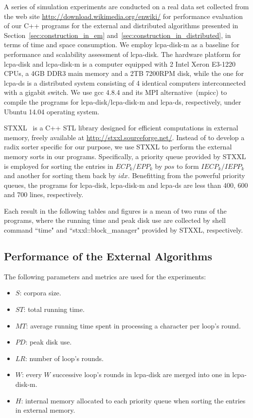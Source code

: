\documentclass[10pt,journal,letterpaper,compsoc]{IEEEtran}
\begin{document}
\begin{CJK*}{GBK}{song}
A series of simulation experiments are conducted on a real data set collected from the web site \url{http://download.wikimedia.org/enwiki/} for performance evaluation of our {C++} programs for the external and distributed algorithms presented in Section~\ref{sec:construction_in_em} and~\ref{sec:construction_in_distributed}, in terms of time and space consumption. We employ lcpa-disk-m as a baseline for performance and scalability assessment of lcpa-disk. The hardware platform for lcpa-disk and lcpa-disk-m is a computer equipped with 2 Intel Xeron E3-1220 CPUs, a 4GB DDR3 main memory and a 2TB 7200RPM disk, while the one for lcpa-ds is a distributed system consisting of 4 identical computers interconnected with a gigabit switch. We use gcc 4.8.4 and its MPI alternative~(mpicc) to compile the programs for lcpa-disk/lcpa-disk-m and lcpa-ds, respectively, under Ubuntu 14.04 operating system.

STXXL~\cite{Dementiev2007} is a {C++} STL library designed for efficient computations in external memory, freely available at \url{http://stxxl.sourceforge.net/}. Instead of to develop a radix sorter specific for our purpose, we use STXXL to perform the external memory sorts in our programs. Specifically, a priority queue  provided by STXXL is employed for sorting the entries in $ECP_k/EPP_k$ by $pos$ to form $IECP_k/IEPP_k$ and another for sorting them back by $idx$. Benefitting from the powerful priority queues, the programs for lcpa-disk, lcpa-disk-m and lcpa-ds are less than 400, 600 and 700 lines, respectively.

Each result in the following tables and figures is a mean of two runs of the programs, where the running time and peak disk use are collected by shell command ``time" and ``stxxl::block\_manager" provided by STXXL, respectively.

\subsection{Performance of the External Algorithms}

The following parameters and metrics are used for the experiments:
\begin{itemize}
\item $S$: corpora size.
\item $ST$: total running time.
\item $MT$: average running time spent in processing a character per loop's round.
\item $PD$: peak disk use.
\item $LR$: number of loop's rounds.
\item $W$: every $W$ successive loop's rounds in lcpa-disk are merged into one in lcpa-disk-m.
\item $H$: internal memory allocated to each priority queue when sorting the entries in external memory.
\end{itemize}


\end{CJK*}
\end{document}
